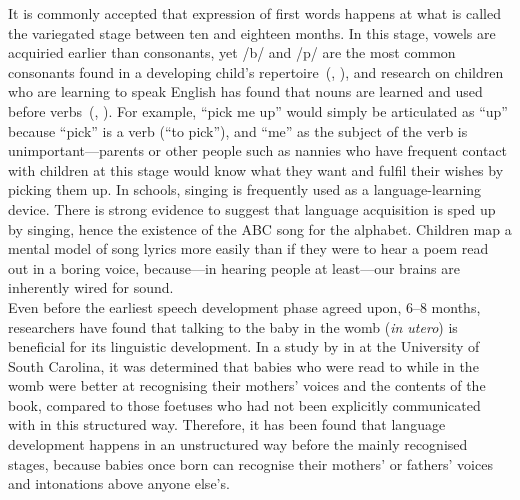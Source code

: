 \documentclass[12pt]{article}
\begin{document}
It is commonly accepted that expression of first words happens at what
is called the variegated stage between ten and eighteen months. In
this stage, vowels are acquiried earlier than consonants, yet /b/
and /p/ are the most common consonants found in a developing child's
repertoire~(\citeauthor{ogrady-cla}, \citeyear{ogrady-cla}), and
research on children who are learning to speak English has found that
nouns are learned and used before verbs~(\citeauthor{nouns-before-verbs},
\citeyear{nouns-before-verbs}). For example, ``pick me up'' would
simply be articulated as ``up'' because ``pick'' is a verb (``to
pick''), and ``me'' as the subject of the verb is
unimportant---parents or other people such as nannies who have
frequent contact with children at this stage would know what they want
and fulfil their wishes by picking them up. In schools, singing is
frequently used as a language-learning device. There is strong
evidence to suggest that language acquisition is sped up by singing,
hence the existence of the ABC song for the alphabet. Children
map a mental model of song lyrics more easily than if they were to
hear a poem read out in a boring voice, because---in hearing people at
least---our brains are inherently wired for
sound.~\cite{wired-for-sound}\\

Even before the earliest speech development phase agreed upon, 6--8
months, researchers have found that talking to the baby in the womb
(\textit{in utero}) is beneficial for its linguistic development. In a
study by \citeauthor{talking-in-utero} in \citeyear{talking-in-utero}
at the University of South Carolina, it was determined that babies who
were read to while in the womb were better at recognising their
mothers' voices and the contents of the book, compared to those
foetuses who had not been explicitly communicated with in this
structured way. Therefore, it has been found that language development
happens in an unstructured way before the mainly recognised stages,
because babies once born can recognise their mothers' or fathers'
voices and intonations above anyone else's.\\
\end{document}
